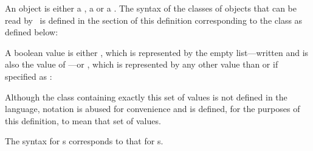 \begin{optDefinition}
An object is either a , a  or a .  The
syntax of the classes of objects that can be read by \eulisp\ is defined in the
section of this definition corresponding to the class as defined below:
%
\Syntax
\label{object-syntax}

\label{boolean}
%
A boolean value is either  , which is
represented by the empty list---written \nil{} and is also the value of
---or  , which is represented by
any other value than \nil{} or if specified as \true{}:
%
\Syntax
\label{object-syntax}

Although the class containing exactly this set of values is not defined in the
language, notation is abused for convenience and 
 is defined, for the purposes of this definition, to
mean that set of values.

The syntax for s 
 corresponds to that for s.

\end{optDefinition}
